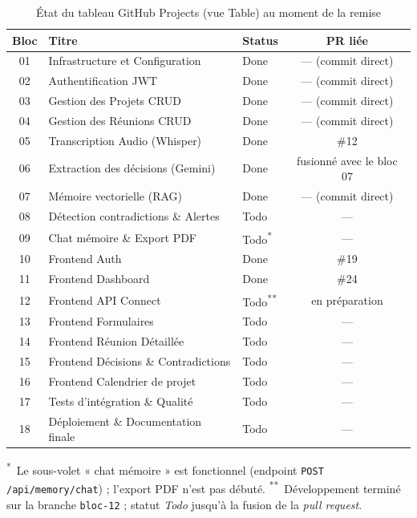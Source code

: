 \documentclass[12pt, a4paper]{article}
\begin{document}
\begin{table}[H]
\centering
\caption{État du tableau GitHub Projects (vue Table) au moment de la remise}
\label{tab:board}
\begin{tabularx}{\textwidth}{clXc}
\toprule
\textbf{Bloc} & \textbf{Titre} & \textbf{Status} & \textbf{PR liée} \\
\midrule
01 & Infrastructure et Configuration        & Done & — (commit direct) \\
02 & Authentification JWT                   & Done & — (commit direct) \\
03 & Gestion des Projets CRUD                & Done & — (commit direct) \\
04 & Gestion des Réunions CRUD                & Done & — (commit direct) \\
05 & Transcription Audio (Whisper)            & Done & \#12 \\
06 & Extraction des décisions (Gemini)        & Done & fusionné avec le bloc 07 \\
07 & Mémoire vectorielle (RAG)                 & Done & — (commit direct) \\
08 & Détection contradictions \& Alertes      & Todo & — \\
09 & Chat mémoire \& Export PDF                & Todo\textsuperscript{*} & — \\
10 & Frontend Auth                             & Done & \#19 \\
11 & Frontend Dashboard                        & Done & \#24 \\
12 & Frontend API Connect                      & Todo\textsuperscript{**} & en préparation \\
13 & Frontend Formulaires                      & Todo & — \\
14 & Frontend Réunion Détaillée                & Todo & — \\
15 & Frontend Décisions \& Contradictions      & Todo & — \\
16 & Frontend Calendrier de projet              & Todo & — \\
17 & Tests d'intégration \& Qualité             & Todo & — \\
18 & Déploiement \& Documentation finale        & Todo & — \\
\bottomrule
\end{tabularx}
\vspace{4pt}
{\footnotesize \textsuperscript{*}~Le sous-volet « chat mémoire » est fonctionnel (endpoint \texttt{POST /api/memory/chat}) ; l'export PDF n'est pas débuté. \quad \textsuperscript{**}~Développement terminé sur la branche \texttt{bloc-12} ; statut \textit{Todo} jusqu'à la fusion de la \textit{pull request}.}
\end{table}
\end{document}
